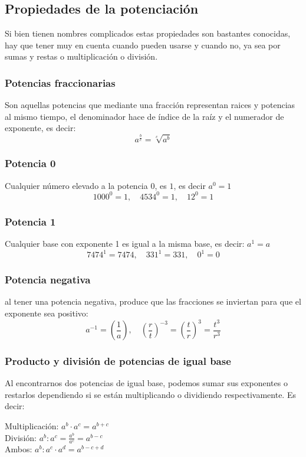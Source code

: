 \documentclass[a4paper]{article}
\begin{document}
\subsection{Propiedades de la potenciación}

Si bien tienen nombres complicados estas propiedades son bastantes conocidas, hay que tener muy en cuenta cuando pueden usarse y cuando no, ya sea por sumas y restas o multiplicación o división.
\subsubsection{Potencias fraccionarias}
Son aquellas potencias que mediante una fracción representan raices y potencias al mismo tiempo, el denominador hace de índice de la raíz y el numerador de exponente, es decir: 
\[a^{\frac{b}{c}}=\sqrt[c]{a^b}\]

\subsubsection{Potencia 0}

Cualquier número elevado a la potencia $0$, es $1$, es decir $a^0=1$
\[
1000^0=1, \quad 4534^0=1, \quad 12^0=1
\]
\subsubsection{Potencia 1}

Cualquier base con exponente 1 es igual a la misma base, es decir: $a^1=a$
\[
7474^1=7474, \quad 331^1=331, \quad 0^1=0
\]
\subsubsection{Potencia negativa}
al tener una potencia negativa, produce que las fracciones se inviertan para que el exponente sea positivo:
\[
a^{-1}=\left(\frac{1}{a}\right), \quad \left(\frac{r}{t}\right)^{-3}=\left(\frac{t}{r}\right)^{3}=\frac{t^3}{r^3}
\]
\subsubsection{Producto y división de potencias de igual base}

Al encontrarnos dos potencias de igual base, podemos sumar sus exponentes o restarlos dependiendo si se están multiplicando o dividiendo respectivamente. Es decir:
\begin{flushleft}
    Multiplicación: $a^b \cdot a^c=a^{b+c}$\\
    División: $a^b:a^c=\frac{a^b}{a^c}=a^{b-c}$\\
    Ambos: $a^b:a^c \cdot a^d=a^{b-c+d}$
\end{flushleft}
\end{document}
